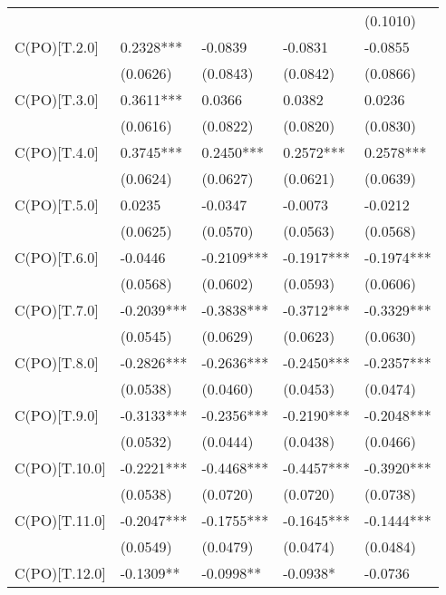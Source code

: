 \begin{table}
\begin{center}
\begin{tabular}{lllll}
                         &            &            &            & (0.1010)    \\
C(PO)[T.2.0]             & 0.2328***  & -0.0839    & -0.0831    & -0.0855     \\
                         & (0.0626)   & (0.0843)   & (0.0842)   & (0.0866)    \\
C(PO)[T.3.0]             & 0.3611***  & 0.0366     & 0.0382     & 0.0236      \\
                         & (0.0616)   & (0.0822)   & (0.0820)   & (0.0830)    \\
C(PO)[T.4.0]             & 0.3745***  & 0.2450***  & 0.2572***  & 0.2578***   \\
                         & (0.0624)   & (0.0627)   & (0.0621)   & (0.0639)    \\
C(PO)[T.5.0]             & 0.0235     & -0.0347    & -0.0073    & -0.0212     \\
                         & (0.0625)   & (0.0570)   & (0.0563)   & (0.0568)    \\
C(PO)[T.6.0]             & -0.0446    & -0.2109*** & -0.1917*** & -0.1974***  \\
                         & (0.0568)   & (0.0602)   & (0.0593)   & (0.0606)    \\
C(PO)[T.7.0]             & -0.2039*** & -0.3838*** & -0.3712*** & -0.3329***  \\
                         & (0.0545)   & (0.0629)   & (0.0623)   & (0.0630)    \\
C(PO)[T.8.0]             & -0.2826*** & -0.2636*** & -0.2450*** & -0.2357***  \\
                         & (0.0538)   & (0.0460)   & (0.0453)   & (0.0474)    \\
C(PO)[T.9.0]             & -0.3133*** & -0.2356*** & -0.2190*** & -0.2048***  \\
                         & (0.0532)   & (0.0444)   & (0.0438)   & (0.0466)    \\
C(PO)[T.10.0]            & -0.2221*** & -0.4468*** & -0.4457*** & -0.3920***  \\
                         & (0.0538)   & (0.0720)   & (0.0720)   & (0.0738)    \\
C(PO)[T.11.0]            & -0.2047*** & -0.1755*** & -0.1645*** & -0.1444***  \\
                         & (0.0549)   & (0.0479)   & (0.0474)   & (0.0484)    \\
C(PO)[T.12.0]            & -0.1309**  & -0.0998**  & -0.0938*   & -0.0736     \\

\end{tabular}
\end{center}
\end{table}
